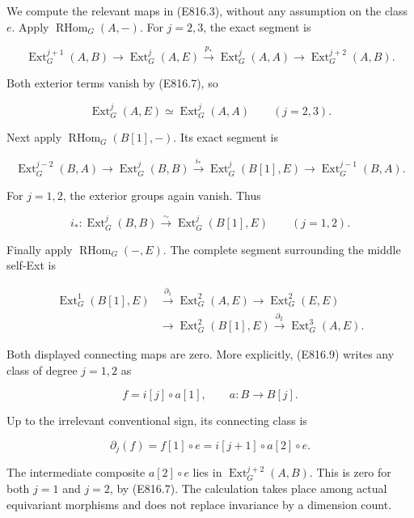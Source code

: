 We compute the relevant maps in (E816.3), without any assumption on the
class \(e\). Apply \(\operatorname{RHom}_G(A,-)\). For \(j=2,3\), the
exact segment is

\[
 \operatorname{Ext}^{j+1}_G(A,B)
  \longrightarrow\operatorname{Ext}^{j}_G(A,E)
  \xrightarrow{p_*}\operatorname{Ext}^{j}_G(A,A)
  \longrightarrow\operatorname{Ext}^{j+2}_G(A,B).
\]

Both exterior terms vanish by (E816.7), so

\[
 \operatorname{Ext}^{j}_G(A,E)
       \simeq\operatorname{Ext}^{j}_G(A,A)
       \qquad(j=2,3).
 \tag{E816.8}
\]

Next apply \(\operatorname{RHom}_G(B[1],-)\). Its exact segment is

\[
 \operatorname{Ext}^{j-2}_G(B,A)
  \longrightarrow\operatorname{Ext}^{j}_G(B,B)
  \xrightarrow{i_*}\operatorname{Ext}^{j}_G(B[1],E)
  \longrightarrow\operatorname{Ext}^{j-1}_G(B,A).
\]

For \(j=1,2\), the exterior groups again vanish. Thus

\[
 i_*:\operatorname{Ext}^{j}_G(B,B)
       \xrightarrow{\sim}\operatorname{Ext}^{j}_G(B[1],E)
       \qquad(j=1,2).
 \tag{E816.9}
\]

Finally apply \(\operatorname{RHom}_G(-,E)\). The complete segment
surrounding the middle self-Ext is

\[
 \begin{split}
 \operatorname{Ext}^1_G(B[1],E)
 &\xrightarrow{\partial_1}\operatorname{Ext}^2_G(A,E)
 \longrightarrow\operatorname{Ext}^2_G(E,E)\\
 &\longrightarrow\operatorname{Ext}^2_G(B[1],E)
 \xrightarrow{\partial_2}\operatorname{Ext}^3_G(A,E).
 \end{split}
 \tag{E816.10}
\]

Both displayed connecting maps are zero. More explicitly, (E816.9)
writes any class of degree \(j=1,2\) as

\[
 f=i[j]\circ a[1],
 \qquad a:B\longrightarrow B[j].
\]

Up to the irrelevant conventional sign, its connecting class is

\[
 \partial_j(f)=f[1]\circ e
   =i[j+1]\circ a[2]\circ e.
 \tag{E816.11}
\]

The intermediate composite \(a[2]\circ e\) lies in
\(\operatorname{Ext}^{j+2}_G(A,B)\). This is zero for both \(j=1\) and
\(j=2\), by (E816.7). The calculation takes place among actual
equivariant morphisms and does not replace invariance by a dimension
count.

